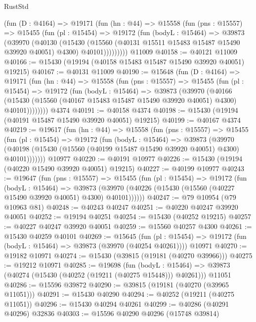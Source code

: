 \begin{lexlean}{RustStd}
\begin{coremodule}
{\begin{coremodule}
{{{{{{{{{{{{{{{{{{{{{{{{{{{{{{{{{{{{{{{{{{{{{{{{{{{{{{{{{{{{      (fun (D : @4164) =>
      @19171
        (fun (hn : @44) =>
        @15558
          (fun (pns : @15557) =>
          @15455
            (fun (pl : @15454) =>
            @19172
              (fun (bodyL : @15464) =>
              @39873
                (@39970
                  (@40130
                    (@15430
                      (@15560 (@40131 @15511 @15483 @15487 @15490 @39920 @40051) @4300)
                      @40101)))))))))
    @11009
@40158 := @40121 @11009
@40166 := @15430 (@19194 (@40158 @15483 @15487 @15490 @39920 @40051) @19215)
@40167 := @40131 @11009
@40190 := @15648
    (fun (D : @4164) =>
    @19171
      (fun (hn : @44) =>
      @15558
        (fun (pns : @15557) =>
        @15455
          (fun (pl : @15454) =>
          @19172
            (fun (bodyL : @15464) =>
            @39873
              (@39970
                (@40166
                  (@15430 (@15560 (@40167 @15483 @15487 @15490 @39920 @40051) @4300) @40101))))))))
    @4374
@40191 := @40158 @4374
@40198 := @15430 (@19194 (@40191 @15487 @15490 @39920 @40051) @19215)
@40199 := @40167 @4374
@40219 := @19617
    (fun (hn : @44) =>
    @15558
      (fun (pns : @15557) =>
      @15455
        (fun (pl : @15454) =>
        @19172
          (fun (bodyL : @15464) =>
          @39873
            (@39970
              (@40198 (@15430 (@15560 (@40199 @15487 @15490 @39920 @40051) @4300) @40101)))))))
    @10977
@40220 := @40191 @10977
@40226 := @15430 (@19194 (@40220 @15490 @39920 @40051) @19215)
@40227 := @40199 @10977
@40243 := @19647
    (fun (pns : @15557) =>
    @15455
      (fun (pl : @15454) =>
      @19172
        (fun (bodyL : @15464) =>
        @39873 (@39970 (@40226 (@15430 (@15560 (@40227 @15490 @39920 @40051) @4300) @40101))))))
@40247 := @79 @10954 (@79 @10963 @81)
@40248 := @40243 @40247
@40251 := @40220 @40247 @39920 @40051
@40252 := @19194 @40251
@40254 := @15430 (@40252 @19215)
@40257 := @40227 @40247 @39920 @40051
@40259 := @15560 @40257 @4300
@40261 := @15430 @40259 @40101
@40269 := @15645
    (fun (pl : @15454) => @19172 (fun (bodyL : @15464) => @39873 (@39970 (@40254 @40261))))
    @10971
@40270 := @19182 @10971
@40274 := @15430 (@39815 (@19181 (@40270 @39966)))
@40275 := @19212 @10971
@40285 := @19698
    (fun (bodyL : @15464) => @39873 (@40274 (@15430 (@40252 (@19211 (@40275 @15448))) @40261)))
    @11051
@40286 := @15596 @39872
@40290 := @39815 (@19181 (@40270 (@39965 @11051)))
@40291 := @15430 @40290
@40294 := @40252 (@19211 (@40275 @11051))
@40296 := @15430 @40294 @40261
@40299 := @40286 (@40291 @40296) @32836
@40303 := @15596 @40290 @40296 (@15748 @39814)
}}}}}}}}}}}}}}}}}}}}}}}}}}}}}}}}}}}}}}}}}}}}}}}}}}}}}}}}}}}}
\end{coremodule}}
\end{coremodule}
\end{lexlean}
